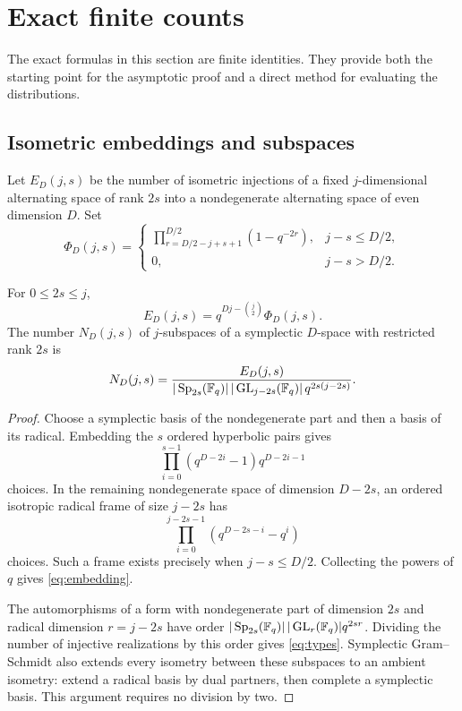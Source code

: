 \section{Exact finite counts}\label{sec:counting}

The exact formulas in this section are finite identities. They provide
both the starting point for the asymptotic proof and a direct method for
evaluating the distributions.

\subsection{Isometric embeddings and subspaces}

Let \(E_D(j,s)\) be the number of isometric injections of a fixed
\(j\)-dimensional alternating space of rank \(2s\) into a nondegenerate
alternating space of even dimension \(D\). Set
\begin{equation}\label{eq:Phi}
 \Phi_D(j,s)=
 \begin{cases}
 \displaystyle\prod_{r=D/2-j+s+1}^{D/2}(1-q^{-2r}),
                 &j-s\le D/2,\\
 0,              &j-s>D/2.
 \end{cases}
\end{equation}

\begin{lemma}\label{lem:embeddings}
For \(0\le2s\le j\),
\begin{equation}\label{eq:embedding}
 E_D(j,s)=q^{Dj-\binom j2}\Phi_D(j,s).
\end{equation}
The number \(N_D(j,s)\) of \(j\)-subspaces of a symplectic \(D\)-space
with restricted rank \(2s\) is
\begin{equation}\label{eq:types}
 N_D(j,s)=
 \frac{E_D(j,s)}
 {|\operatorname{Sp}_{2s}(\mathbb F_q)|\,|\operatorname{GL}_{j-2s}(\mathbb F_q)|\,q^{2s(j-2s)}}.
\end{equation}
\end{lemma}

\begin{proof}
Choose a symplectic basis of the nondegenerate part and then a basis of
its radical. Embedding the \(s\) ordered hyperbolic pairs gives
\[
 \prod_{i=0}^{s-1}(q^{D-2i}-1)q^{D-2i-1}
\]
choices. In the remaining nondegenerate space of dimension \(D-2s\),
an ordered isotropic radical frame of size \(j-2s\) has
\[
 \prod_{i=0}^{j-2s-1}(q^{D-2s-i}-q^i)
\]
choices. Such a frame exists precisely when \(j-s\le D/2\).
Collecting the powers of \(q\) gives \eqref{eq:embedding}.

The automorphisms of a form with nondegenerate part of dimension \(2s\)
and radical dimension \(r=j-2s\) have order
\(|\operatorname{Sp}_{2s}(\mathbb F_q)|\,|\operatorname{GL}_r(\mathbb F_q)|q^{2sr}\).
Dividing the number of injective realizations by this order gives
\eqref{eq:types}. Symplectic Gram--Schmidt also extends every isometry
between these subspaces to an ambient isometry: extend a radical basis
by dual partners, then complete a symplectic basis. This argument
requires no division by two.
\end{proof}

